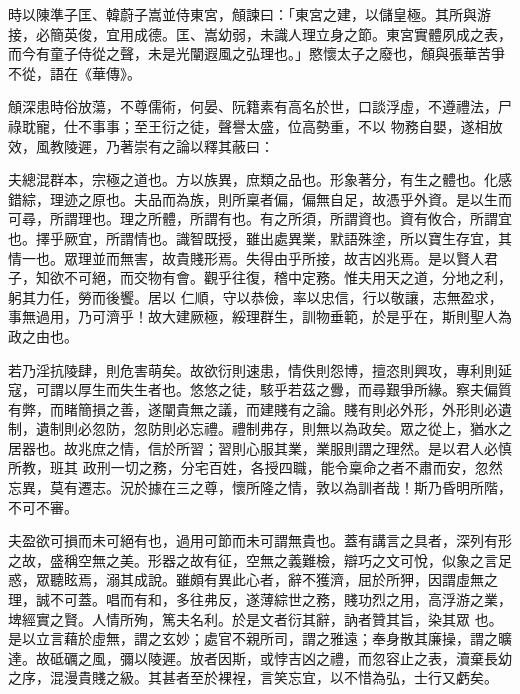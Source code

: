\begin{pinyinscope}
 時以陳準子匡、韓蔚子嵩並侍東宮，頠諫曰：「東宮之建，以儲皇極。其所與游接，必簡英俊，宜用成德。匡、嵩幼弱，未識人理立身之節。東宮實體夙成之表，而今有童子侍從之聲，未是光闡遐風之弘理也。」愍懷太子之廢也，頠與張華苦爭不從，語在《華傳》。



 頠深患時俗放蕩，不尊儒術，何晏、阮籍素有高名於世，口談浮虛，不遵禮法，尸祿耽寵，仕不事事；至王衍之徒，聲譽太盛，位高勢重，不以
 物務自嬰，遂相放效，風教陵遲，乃著崇有之論以釋其蔽曰：



 夫總混群本，宗極之道也。方以族異，庶類之品也。形象著分，有生之體也。化感錯綜，理迹之原也。夫品而為族，則所稟者偏，偏無自足，故憑乎外資。是以生而可尋，所謂理也。理之所體，所謂有也。有之所須，所謂資也。資有攸合，所謂宜也。擇乎厥宜，所謂情也。識智既授，雖出處異業，默語殊塗，所以寶生存宜，其情一也。眾理並而無害，故貴賤形焉。失得由乎所接，故吉凶兆焉。是以賢人君子，知欲不可絕，而交物有會。觀乎往復，稽中定務。惟夫用天之道，分地之利，躬其力任，勞而後饗。居以
 仁順，守以恭儉，率以忠信，行以敬讓，志無盈求，事無過用，乃可濟乎！故大建厥極，綏理群生，訓物垂範，於是乎在，斯則聖人為政之由也。



 若乃淫抗陵肆，則危害萌矣。故欲衍則速患，情佚則怨博，擅恣則興攻，專利則延寇，可謂以厚生而失生者也。悠悠之徒，駭乎若茲之釁，而尋艱爭所緣。察夫偏質有弊，而睹簡損之善，遂闡貴無之議，而建賤有之論。賤有則必外形，外形則必遺制，遺制則必忽防，忽防則必忘禮。禮制弗存，則無以為政矣。眾之從上，猶水之居器也。故兆庶之情，信於所習；習則心服其業，業服則謂之理然。是以君人必慎所教，班其
 政刑一切之務，分宅百姓，各授四職，能令稟命之者不肅而安，忽然忘異，莫有遷志。況於據在三之尊，懷所隆之情，敦以為訓者哉！斯乃昏明所階，不可不審。



 夫盈欲可損而未可絕有也，過用可節而未可謂無貴也。蓋有講言之具者，深列有形之故，盛稱空無之美。形器之故有征，空無之義難檢，辯巧之文可悅，似象之言足惑，眾聽眩焉，溺其成說。雖頗有異此心者，辭不獲濟，屈於所狎，因謂虛無之理，誠不可蓋。唱而有和，多往弗反，遂薄綜世之務，賤功烈之用，高浮游之業，埤經實之賢。人情所殉，篤夫名利。於是文者衍其辭，訥者贊其旨，染其眾
 也。是以立言藉於虛無，謂之玄妙；處官不親所司，謂之雅遠；奉身散其廉操，謂之曠達。故砥礪之風，彌以陵遲。放者因斯，或悖吉凶之禮，而忽容止之表，瀆棄長幼之序，混漫貴賤之級。其甚者至於裸裎，言笑忘宜，以不惜為弘，士行又虧矣。




\end{pinyinscope}
